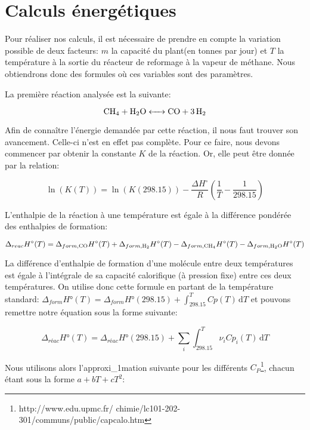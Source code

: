 \documentclass[a4paper, oneside, 12pt]{article}
\begin{document}
\section{Calculs énergétiques}

Pour réaliser nos calculs, il est nécessaire de prendre 
en compte la variation possible de 
deux facteurs: $m$ la capacité du plant(en tonnes par jour) 
et $T$ la température à la sortie du
réacteur de reformage à la vapeur de méthane.
Nous obtiendrons donc des formules où ces variables sont des paramètres.

La première réaction analysée est la suivante:

\begin{equation*}
	\ce{CH4 + H2O <-> CO + 3H2}
\end{equation*}

Afin de connaître l'énergie demandée par cette réaction,
il nous faut trouver son avancement. Celle-ci n'est en effet pas complète.
Pour ce faire, nous devons commencer par obtenir la constante $K$ 
de la réaction. Or, elle peut être donnée par la relation:

\begin{equation}
	\ln{(K(T))} = \ln{(K(298.15))} - 
	\frac{\Delta H^{\circ}}{R}(\frac{1}{T} - \frac{1}{298.15})
\end{equation}

L'enthalpie de la réaction à une température est égale 
à la différence pondérée des enthalpies de formation:

\begin{equation}
	\Delta_{reac} H^{\circ} (T)= \Delta_{form,\ce{CO}} H^{\circ}(T)
	+\Delta_{form, \ce{H2}} H^{\circ} (T) - \Delta_{form, \ce{CH4}} H^{\circ} (T) 
	-\Delta_{form, \ce{H2O}} H^{\circ} (T)
\end{equation}

La différence d'enthalpie de formation d'une molécule entre deux 
températures est égale à l'intégrale de sa capacité calorifique 
(à pression fixe) entre ces deux températures.
On utilise donc cette formule en partant de la  température 
standard: $\Delta_{form}H°(T)= \Delta_{form}H°(298.15)+\int_298.15^T Cp(T) \, \mathrm dT$ et pouvons 
remettre notre équation sous la forme suivante:

\begin{equation}
	\Delta_{réac}H°(T)=\Delta_{réac}H°(298.15)+\sum_i \int_{298.15}^T \nu_i Cp_i(T) \, \mathrm dT
\end{equation}

Nous utilisons alors l'approxi_{1}mation suivante pour les différents $C_P$\footnote{http://www.edu.upmc.fr/
chimie/lc101-202-301/communs/public/capcalo.htm}, 
chacun étant sous la forme $a+bT+cT^2$:
\end{document}
